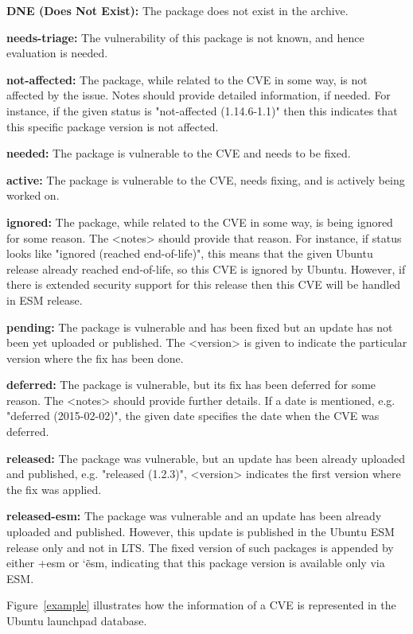 \documentclass[a4paper,num-refs]{oup-contemporary}
\begin{document}
\textbf{DNE (Does Not Exist):} The package does not exist in the
		archive.

\textbf{needs-triage:} The vulnerability of this package
		is not known, and hence evaluation is needed.

\textbf{not-affected:} The package, while related to the
		CVE in some way, is not affected by the issue. Notes should
		provide detailed information, if needed. For instance, if the given
		status is "not-affected (1.14.6-1.1)" then this indicates that this specific
		package version is not affected.

\textbf{needed:} The package is vulnerable to the
		CVE and needs to be fixed.

\textbf{active:} The package is vulnerable to the
		CVE, needs fixing, and is actively being worked on.

\textbf{ignored:} The package, while related to the
		CVE in some way, is being ignored for some reason. The
		<notes> should provide that reason. For instance, if status looks like
		"ignored (reached end-of-life)", this means that the given Ubuntu release already reached
		end-of-life, so this CVE is ignored by Ubuntu. However, if there
		is extended security support for this release then this
		CVE will be handled in ESM release.

\textbf{pending:} The package is vulnerable and
                  has been fixed but an update has not been yet uploaded or
		  published. The <version> is given to indicate the particular 
		  version where the fix has been done.

\textbf{deferred:} The package is vulnerable, but 
                   its fix has been deferred for some reason. The <notes>
		   should provide further details. If a date is mentioned, e.g.
		   "deferred (2015-02-02)", the given date specifies the date when
		   the CVE was deferred.

\textbf{released:} The package was vulnerable, but
		an update has been already uploaded and published, e.g. "released (1.2.3)",
		<version> indicates the first version where the fix was applied.

\textbf{released-esm:} The package was vulnerable and
		an update has been already uploaded and published. However,
		this update is published in the Ubuntu ESM release only and not in LTS.
		The fixed version of such packages is appended by either
		+esm or \char`\~esm, indicating that this package version is available
		only via ESM.

Figure~\ref{example} illustrates how the information of a CVE is represented
in the Ubuntu launchpad database.
\end{document}
